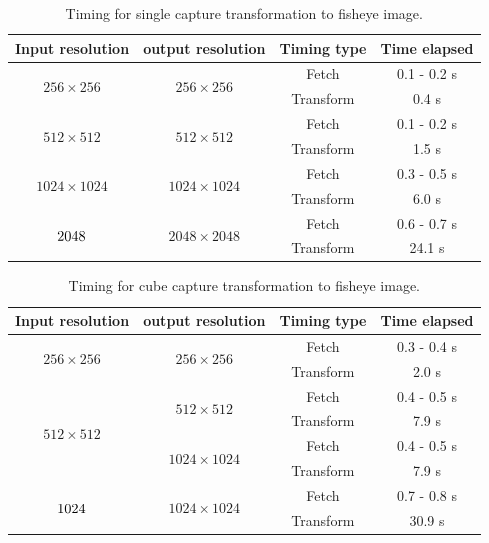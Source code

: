 \begin{table}[!htb]
    \centering
    \caption{Timing for single capture transformation to fisheye image.}
    \label{tab:res_timing_single}
    \begin{tabular}{|c|c|c|c|} \hline
        \textbf{Input resolution} & \textbf{output resolution} & \textbf{Timing type} & \textbf{Time elapsed} \\ \hline \hline
        \multirow{2}{*}{$256 \times 256$} & \multirow{2}{*}{$256 \times 256$} & Fetch & 0.1 - 0.2 s \\ \cline{3-4}
         & & Transform & 0.4 s \\ \hline
        \multirow{2}{*}{$512 \times 512$} & \multirow{2}{*}{$512 \times 512$} & Fetch & 0.1 - 0.2 s\\ \cline{3-4}
         & & Transform & 1.5 s \\ \hline
        \multirow{2}{*}{$1024 \times 1024$} & \multirow{2}{*}{$1024 \times 1024$} & Fetch &  0.3 - 0.5 s \\ \cline{3-4}
         & & Transform & 6.0 s \\ \hline
        \multirow{2}{*}{$2048 \time 2048$} & \multirow{2}{*}{$2048 \times 2048$} & Fetch & 0.6 - 0.7 s\\ \cline{3-4}
         & & Transform & 24.1 s\\ \hline
    \end{tabular}
\end{table}

\begin{table}[!htb]
    \centering
    \caption{Timing for cube capture transformation to fisheye image.}
    \label{tab:res_timing_cube_capture}
    \begin{tabular}{|c|c|c|c|} \hline
        \textbf{Input resolution} & \textbf{output resolution} & \textbf{Timing type} & \textbf{Time elapsed} \\ \hline \hline
        \multirow{2}{*}{$256 \times 256$} & \multirow{2}{*}{$256 \times 256$} & Fetch & 0.3 - 0.4 s\\ \cline{3-4}
         & & Transform & 2.0 s\\ \hline
        \multirow{4}{*}{$512 \times 512$} & \multirow{2}{*}{$512 \times 512$} & Fetch & 0.4 - 0.5 s \\ \cline{3-4}
         & & Transform & 7.9 s\\ \cline{2-4}
         & \multirow{2}{*}{$1024 \times 1024$} & Fetch & 0.4 - 0.5 s\\ \cline{3-4}
         & & Transform & 7.9 s\\ \hline
        \multirow{2}{*}{$1024 \time 1024$} & \multirow{2}{*}{$1024 \times 1024$} & Fetch & 0.7 - 0.8 s\\ \cline{3-4}
         & & Transform & 30.9 s\\ \hline
    \end{tabular}
\end{table}

